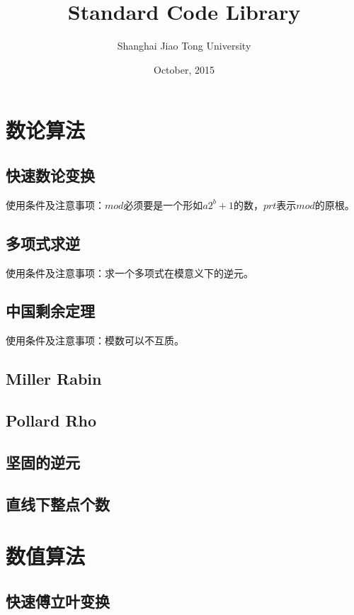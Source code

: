 \documentclass[openany, a4paper, 10pt]{book}
\begin{document}
	\title{\textbf{\LARGE{Standard Code Library}}}
	\author{Shanghai Jiao Tong University}
	\date{October, 2015}
	\maketitle
	\tableofcontents
	\begin{spacing}{1.1}
	\chapter{数论算法}
		\section{快速数论变换}
			使用条件及注意事项：$mod$必须要是一个形如$a2^b + 1$的数，$prt$表示$mod$的原根。
			
		\section{多项式求逆}
			使用条件及注意事项：求一个多项式在模意义下的逆元。
			
		\section{中国剩余定理}
			使用条件及注意事项：模数可以不互质。
			
		\section{Miller Rabin}
			
		\section{Pollard Rho}
			
		\section{坚固的逆元}
			
		\section{直线下整点个数}
			
	\chapter{数值算法}
		\section{快速傅立叶变换}
			

\end{spacing}
\end{document}

